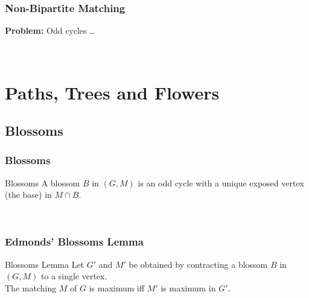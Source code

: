 \documentclass[pdftex]{beamer}
\begin{document}
\begin{frame} \frametitle{Non-Bipartite Matching}
  \textbf{Problem:} Odd cycles \ldots
  \begin{center}
    \\
    \vspace{1cm}
    
  \end{center}
\end{frame}



\section{Paths, Trees and Flowers}

\subsection{Blossoms}

\begin{frame} \frametitle{Blossoms}
  \begin{block}{Blossoms}
    A blossom $B$ in $(G, M)$ is an odd cycle with a unique exposed
    vertex (the base) in $M \cap B$.
  \end{block}
  \begin{center}
    \\
    \vspace{.5cm}
    
  \end{center}
\end{frame}

\begin{frame} \frametitle{Edmonds' Blossoms Lemma}
  \begin{block}{Blossoms Lemma}
    Let $G'$ and $M'$ be obtained by contracting a blossom $B$ in $(G,
    M)$ to a single vertex.\\
    The matching $M$ of $G$ is maximum iff $M'$ is maximum in $G'$.
  \end{block}
  \begin{center}
    \\
    \vspace{.5cm}
    
  \end{center}
\end{frame}
\end{document}

